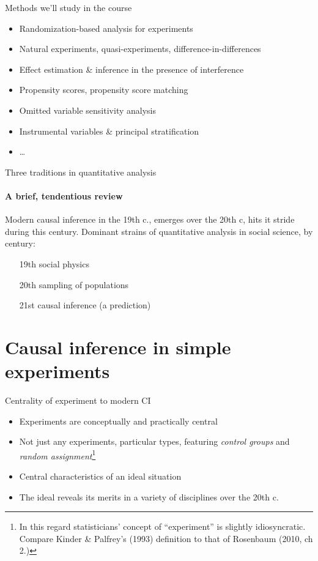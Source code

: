 

\begin{frame}[label=whatWeWillCoverFr]{Methods we'll study in the course}
  \begin{itemize}
  \item Randomization-based analysis for experiments
  \item Natural experiments, quasi-experiments,
    difference-in-differences
  \item Effect estimation \& inference in the presence of interference
  \item Propensity scores, propensity score matching
  \item Omitted variable sensitivity analysis
  \item Instrumental variables \& principal stratification
  \item \ldots
  \end{itemize}
\end{frame}


\begin{frame}[handout:0]{Three traditions in quantitative analysis}
\framesubtitle{A brief, tendentious review}

Modern causal inference in the 19th c., emerges over the 20th c, hits
it stride during this century. Dominant strains of quantitative
analysis in social science, by century:

\begin{itemize}
\item[19th] social physics
\item[20th] sampling of populations
\item[21st] causal inference (a prediction)
\end{itemize}

  
\end{frame}

\section{Causal inference in simple experiments}

\begin{frame}{Centrality of experiment to modern CI}
  \begin{itemize}
  \item Experiments are conceptually and practically central
  \item Not just any experiments, particular types, featuring
    \textit{control groups} and \textit{random assignment}\footnote{In
    this regard statisticians' concept of ``experiment'' is slightly
    idiosyncratic.  Compare Kinder \& Palfrey's (1993) definition to that of
    Rosenbaum (2010, ch 2.)}
  \item Central characteristics of an ideal situation
  \item The ideal reveals its merits in a variety of disciplines over
    the 20th c.
  \end{itemize}
\end{frame}

